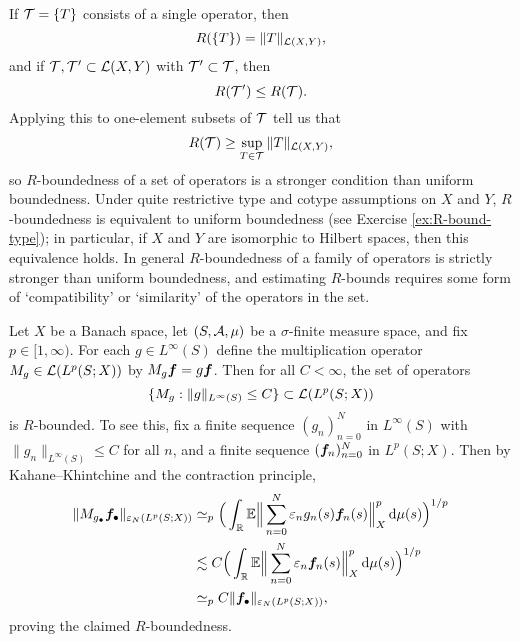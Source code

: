 If $\mathcal{T} = \{T\}$ consists of a single operator, then
\begin{equation*}
  R(\{T\}) = \|T\|_{\mathcal{L}(X,Y)},
\end{equation*}
and if $\mathcal{T},\mathcal{T}' \subset \mathcal{L}(X,Y)$ with $\mathcal{T}' \subset \mathcal{T}$, then
\begin{equation*}
  R(\mathcal{T}') \leq R(\mathcal{T}).
\end{equation*}
Applying this to one-element subsets of $\mathcal{T}$ tell us that
\begin{equation*}
  R(\mathcal{T}) \geq \sup_{T \in \mathcal{T}} \|T\|_{\mathcal{L}(X,Y)},
\end{equation*}
so $R$-boundedness of a set of operators is a stronger condition than uniform boundedness.
Under quite restrictive type and cotype assumptions on $X$ and $Y$, $R$-boundedness is equivalent to uniform boundedness (see Exercise \ref{ex:R-bound-type}); in particular, if $X$ and $Y$ are isomorphic to Hilbert spaces, then this equivalence holds.
In general $R$-boundedness of a family of operators is strictly stronger than uniform boundedness, and estimating $R$-bounds requires some form of `compatibility' or `similarity' of the operators in the set.

\begin{example}\label{eg:R-bounded-multipliers}
  Let $X$ be a Banach space, let $(S,\mathcal{A},\mu)$ be a $\sigma$-finite measure space, and fix $p \in [1,\infty)$.
  For each $g \in L^\infty(S)$ define the multiplication operator $M_{g} \in \mathcal{L}(L^p(S;X))$ by $M_{g}\bm{f} = g\bm{f}$.
  Then for all $C < \infty$, the set of operators
  \begin{equation*}
    \{M_{g}  : \|g\|_{L^\infty(S)} \leq C\} \subset \mathcal{L}(L^{p}(S;X))
  \end{equation*}
  is $R$-bounded.
  To see this, fix a finite sequence $(g_{n})_{n=0}^{N}$ in $L^\infty(S)$ with $\|g_{n}\|_{L^\infty(S)} \leq C$ for all $n$, and a finite sequence $(\bm{f}_{n})_{n=0}^{N}$ in $L^p(S;X)$.
  Then by Kahane--Khintchine and the contraction principle,
  \begin{equation*}
    \begin{aligned}
      \| M_{g_{\bullet}} \bm{f}_{\bullet} \|_{\varepsilon_{N}(L^p(S;X))}
      &\simeq_{p} \Big( \int_{\mathbb{R}} \mathbb{E} \Big\| \sum_{n=0}^{N} \varepsilon_{n} g_{n}(s) \bm{f}_{n}(s) \Big\|_{X}^{p} \, \mathrm{d}\mu(s) \Big)^{1/p} \\
      &\lesssim C \Big( \int_{\mathbb{R}} \mathbb{E} \Big\| \sum_{n=0}^{N} \varepsilon_{n} \bm{f}_{n}(s) \Big\|_{X}^{p} \, \mathrm{d}\mu(s) \Big)^{1/p} \\
      &\simeq_{p} C \| \bm{f}_{\bullet} \|_{\varepsilon_{N}(L^p(S;X))},
    \end{aligned}
  \end{equation*}
  proving the claimed $R$-boundedness.
\end{example}

